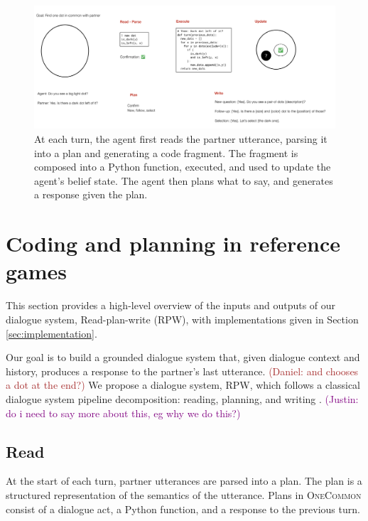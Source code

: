 \documentclass[11pt]{article}
\newcommand{\system}{RPW}
\newcommand{\justin}[1]{{{\textcolor{purple}{(Justin: #1)}}}}
\newcommand{\daniel}[1]{{{\textcolor{brown}{(Daniel: #1)}}}}
\begin{document}
\begin{figure}[t]
\centering
\includegraphics[width=2\columnwidth]{imgs/Onecommon System horizontal.png}
\caption{\label{fig:system}
At each turn, the agent first reads the partner utterance, parsing it into a plan
and generating a code fragment.
The fragment is composed into a Python function, executed, 
and used to update the agent's belief state.
The agent then plans what to say, and generates a response given the plan.
}
\end{figure}

\section{Coding and planning in reference games}
This section provides a high-level overview of the inputs and outputs of our dialogue system, Read-plan-write (\system{}),
with implementations given in Section \ref{sec:implementation}.

Our goal is to build a grounded dialogue system that,
given dialogue context and history,
produces a response to the partner's last utterance.
\daniel{and chooses a dot at the end?}
We propose a dialogue system, \system{},
which follows a classical dialogue system pipeline decomposition:
reading, planning, and writing \citep{young2006pomdp,young2013pomdpsurvey,he2018dnd}.
\justin{do i need to say more about this, eg why we do this?}

\subsection{Read}
At the start of each turn, partner utterances are parsed into a plan.
The plan is a structured representation of 
the semantics of the utterance.
Plans in \textsc{OneCommon} consist of
a dialogue act, a Python function, and a response to the previous turn.
\end{document}

